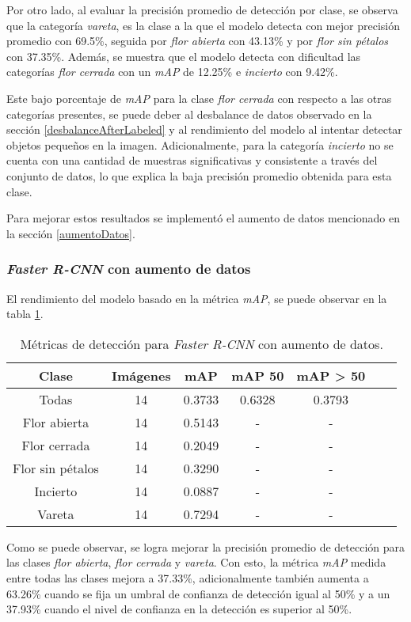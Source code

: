 Por otro lado, al evaluar la precisión promedio de detección por clase, se observa que la categoría \textit{vareta}, es la clase a la que el modelo detecta con mejor precisión promedio con 69.5\%, seguida por \textit{flor abierta} con 43.13\% y por \textit{flor sin pétalos} con 37.35\%. Además, se muestra que el modelo detecta con dificultad las categorías \textit{flor cerrada} con un \textit{mAP} de 12.25\% e \textit{incierto} con 9.42\%.

Este bajo porcentaje de \textit{mAP} para la clase \textit{flor cerrada} con respecto a las otras categorías presentes, se puede deber al desbalance de datos observado en la sección \ref{desbalanceAfterLabeled} y al rendimiento del modelo al intentar detectar objetos pequeños en la imagen. Adicionalmente, para la categoría \textit{incierto} no se cuenta con una cantidad de muestras significativas y consistente a través del conjunto de datos, lo que explica la baja precisión promedio obtenida para esta clase.

Para mejorar estos resultados se implementó el aumento de datos mencionado en la sección \ref{aumentoDatos}.

\subsubsection{\textit{Faster R-CNN} con aumento de datos}

El rendimiento del modelo basado en la métrica \textit{mAP}, se puede observar en la tabla \ref{tab:resultadosFasterConAug}. 

\begin{table}[h]
	\centering
	\caption{Métricas de detección para \textit{Faster R-CNN} con aumento de datos.}
	\begin{tabular}{c c c c c c c}    
		\toprule
		\textbf{Clase}&\textbf{Imágenes}&\textbf{mAP}&\textbf{mAP 50}&\textbf{mAP > 50}\\
		\midrule
		Todas & 14 & 0.3733 & 0.6328 & 0.3793\\
		Flor abierta & 14 & 0.5143 & - & - \\
		Flor cerrada & 14 & 0.2049 & - & - \\
		Flor sin pétalos & 14 & 0.3290 & - & - \\
		Incierto & 14 & 0.0887 & - & - \\
		Vareta & 14 & 0.7294 & - & - \\		
		\bottomrule
		\hline
	\end{tabular}
	\label{tab:resultadosFasterConAug}
\end{table}
\newpage
Como se puede observar, se logra mejorar la precisión promedio de detección para las clases \textit{flor abierta}, \textit{flor cerrada} y \textit{vareta}. Con esto, la métrica \textit{mAP} medida entre todas las clases mejora a 37.33\%, adicionalmente también aumenta a 63.26\% cuando se fija un umbral de confianza de detección igual al 50\% y a un 37.93\% cuando el nivel de confianza en la detección es superior al 50\%.

